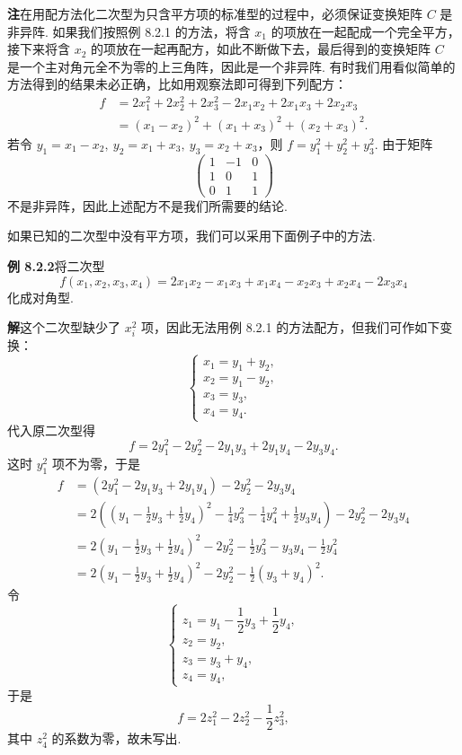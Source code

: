 \documentclass[UTF8,12pt,a4paper,fontset=fandol]{ctexart}
\begin{document}
\noindent\textbf{注}\quad 在用配方法化二次型为只含平方项的标准型的过程中，必须保证变换矩阵 $C$ 是非异阵. 如果我们按照例 8.2.1 的方法，将含 $x_1$ 的项放在一起配成一个完全平方，接下来将含 $x_2$ 的项放在一起再配方，如此不断做下去，最后得到的变换矩阵 $C$ 是一个主对角元全不为零的上三角阵，因此是一个非异阵. 有时我们用看似简单的方法得到的结果未必正确，比如用观察法即可得到下列配方：
\[
\begin{aligned}
f&=2x_1^2+2x_2^2+2x_3^2-2x_1x_2+2x_1x_3+2x_2x_3\\
&=(x_1-x_2)^2+(x_1+x_3)^2+(x_2+x_3)^2.
\end{aligned}
\]
若令 $y_1=x_1-x_2,\ y_2=x_1+x_3,\ y_3=x_2+x_3$，则 $f=y_1^2+y_2^2+y_3^2$. 由于矩阵
\[
\left(\begin{array}{ccc}
1&-1&0\\
1&0&1\\
0&1&1
\end{array}\right)
\]
不是非异阵，因此上述配方不是我们所需要的结论.

如果已知的二次型中没有平方项，我们可以采用下面例子中的方法.

\noindent\textbf{例 8.2.2}\quad 将二次型
\[
f(x_1,x_2,x_3,x_4)=2x_1x_2-x_1x_3+x_1x_4-x_2x_3+x_2x_4-2x_3x_4
\]
化成对角型.

\noindent\textbf{解}\quad 这个二次型缺少了 $x_i^2$ 项，因此无法用例 8.2.1 的方法配方，但我们可作如下变换：
\[
\left\{\begin{array}{l}
x_1=y_1+y_2,\\
x_2=y_1-y_2,\\
x_3=y_3,\\
x_4=y_4.
\end{array}\right.
\]
代入原二次型得
\[
f=2y_1^2-2y_2^2-2y_1y_3+2y_1y_4-2y_3y_4.
\]
这时 $y_1^2$ 项不为零，于是
\[
\begin{aligned}
f&=(2y_1^2-2y_1y_3+2y_1y_4)-2y_2^2-2y_3y_4\\
&=2\left(\left(y_1-\frac12y_3+\frac12y_4\right)^2-\frac14y_3^2-\frac14y_4^2+\frac12y_3y_4\right)-2y_2^2-2y_3y_4\\
&=2\left(y_1-\frac12y_3+\frac12y_4\right)^2-2y_2^2-\frac12y_3^2-y_3y_4-\frac12y_4^2\\
&=2\left(y_1-\frac12y_3+\frac12y_4\right)^2-2y_2^2-\frac12(y_3+y_4)^2.
\end{aligned}
\]
令
\[
\left\{\begin{array}{l}
z_1=y_1-\dfrac12y_3+\dfrac12y_4,\\
z_2=y_2,\\
z_3=y_3+y_4,\\
z_4=y_4,
\end{array}\right.
\]
于是
\[
f=2z_1^2-2z_2^2-\frac12z_3^2,
\]
其中 $z_4^2$ 的系数为零，故未写出.
\end{document}

